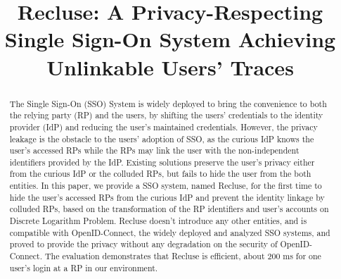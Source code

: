 \documentclass[conference, 10pt]{IEEEtran}
\begin{document}
\title{{Recluse}: A Privacy-Respecting Single Sign-On System Achieving Unlinkable Users' Traces}
%
\maketitle
\begin{abstract}
 The Single Sign-On (SSO) System is widely deployed to bring the convenience to both the relying party (RP) and the users, by shifting the users' credentials to the identity provider (IdP) and reducing the user's maintained  credentials. However, the privacy leakage is the obstacle to the users' adoption of SSO, as the curious IdP knows the user's accessed RPs while the RPs may link the user with the non-independent  identifiers provided by the IdP. Existing solutions preserve the user's privacy either from the curious IdP or the colluded RPs, but fails to hide the user from the both entities. In this paper, we provide a SSO system, named Recluse, for the first time to hide the user's accessed RPs from the curious IdP and prevent the identity linkage by colluded RPs, based on the transformation of the RP identifiers and user's accounts on Discrete Logarithm Problem. Recluse doesn't introduce any other entities, and  is compatible with OpenID-Connect, the widely deployed and analyzed SSO systems, and proved to provide the privacy without any degradation on the security of OpenID-Connect. The evaluation demonstrates that Recluse is efficient, about 200 ms for one user's login at a RP in our environment.
\end{abstract}















\end{document}
